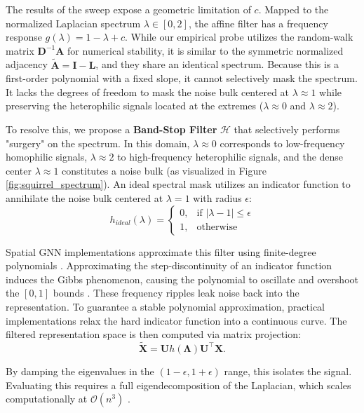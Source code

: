 \documentclass[10pt]{article}
\begin{document}
The results of the sweep expose a geometric limitation of $c$.
Mapped to the normalized Laplacian spectrum $\lambda \in [0, 2]$, the affine filter has a frequency response $g(\lambda) = 1 - \lambda + c$.
While our empirical probe utilizes the random-walk matrix $\mathbf{D}^{-1}\mathbf{A}$ for numerical stability, it is similar to the symmetric normalized adjacency $\tilde{\mathbf{A}} = \mathbf{I} - \mathbf{L}$, and they share an identical spectrum.
Because this is a first-order polynomial with a fixed slope, it cannot selectively mask the spectrum.
It lacks the degrees of freedom to mask the noise bulk centered at $\lambda \approx 1$ while preserving the heterophilic signals located at the extremes ($\lambda \approx 0$ and $\lambda \approx 2$).

To resolve this, we propose a \textbf{Band-Stop Filter} $\mathcal{H}$ that selectively performs "surgery" on the spectrum.
In this domain, $\lambda \approx 0$ corresponds to low-frequency homophilic signals, $\lambda \approx 2$ to high-frequency heterophilic signals, and the dense center $\lambda \approx 1$ constitutes a noise bulk \parencite{balcilar2021} (as visualized in Figure \ref{fig:squirrel_spectrum}).
An ideal spectral mask utilizes an indicator function to annihilate the noise bulk centered at $\lambda = 1$ with radius $\epsilon$:
\begin{equation}
    h_{ideal}(\lambda) = \begin{cases} 
      0, & \text{if } |\lambda - 1| \le \epsilon \\
      1, & \text{otherwise} 
   \end{cases}
\end{equation}

Spatial GNN implementations approximate this filter using finite-degree polynomials \parencite{defferrard2016}.
Approximating the step-discontinuity of an indicator function induces the Gibbs phenomenon, causing the polynomial to oscillate and overshoot the $[0, 1]$ bounds \parencite{he2021}.
These frequency ripples leak noise back into the representation. 
To guarantee a stable polynomial approximation, practical implementations relax the hard indicator function into a continuous curve.
The filtered representation space is then computed via matrix projection:
\begin{equation}
\tilde{\mathbf{X}} = \mathbf{U} h(\mathbf{\Lambda}) \mathbf{U}^\top \mathbf{X}.
\end{equation}

By damping the eigenvalues in the $(1-\epsilon, 1+\epsilon)$ range, this isolates the signal.
Evaluating this requires a full eigendecomposition of the Laplacian, which scales computationally at $\mathcal{O}(n^3)$ \parencite{kipf2017}.
\end{document}
